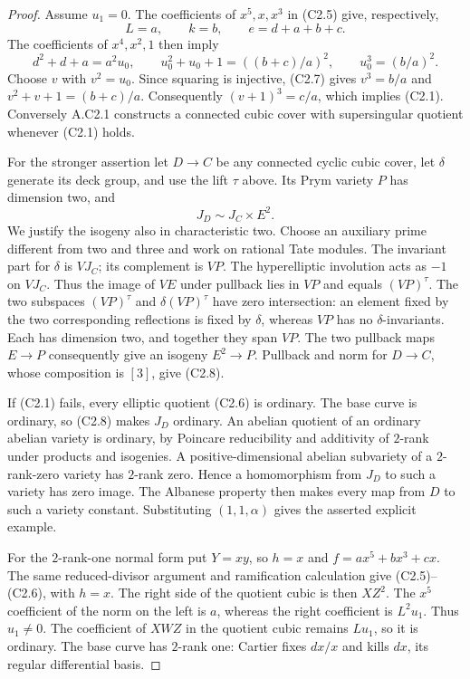 \begin{proof}
Assume $u_1=0$. The coefficients of $x^5,x,x^3$ in (C2.5) give,
respectively,
\[
                  L=a,\qquad k=b,\qquad e=d+a+b+c.
\]
The coefficients of $x^4,x^2,1$ then imply
\[
 d^2+d+a=a^2u_0,\qquad
 u_0^2+u_0+1=((b+c)/a)^2,\qquad u_0^3=(b/a)^2.               \tag{C2.7}
\]
Choose $v$ with $v^2=u_0$. Since squaring is injective,
(C2.7) gives $v^3=b/a$ and $v^2+v+1=(b+c)/a$.
Consequently $(v+1)^3=c/a$, which implies (C2.1).
Conversely A.C2.1 constructs a connected cubic cover with
supersingular quotient whenever (C2.1) holds.

For the stronger assertion let $D\to C$ be any connected cyclic
cubic cover, let $\delta$ generate its deck group, and use the lift
$\tau$ above. Its Prym variety $P$ has dimension two, and
\[
                       J_D\sim J_C\times E^2.              \tag{C2.8}
\]
We justify the isogeny also in characteristic two. Choose an auxiliary
prime different from two and three and work on rational Tate modules.
The invariant part for $\delta$ is $VJ_C$; its complement is $VP$.
The hyperelliptic involution acts as $-1$ on $VJ_C$. Thus the image
of $VE$ under pullback lies in $VP$ and equals $(VP)^\tau$.
The two subspaces $(VP)^\tau$ and
$\delta(VP)^\tau$ have zero intersection: an element fixed by the
two corresponding reflections is fixed by $\delta$, whereas $VP$
has no $\delta$-invariants. Each has dimension two, and together
they span $VP$. The two pullback maps $E\to P$ consequently give
an isogeny $E^2\to P$. Pullback and norm for $D\to C$, whose
composition is $[3]$, give (C2.8).

If (C2.1) fails, every elliptic quotient (C2.6) is ordinary. The
base curve is ordinary, so (C2.8) makes $J_D$ ordinary. An abelian
quotient of an ordinary abelian variety is ordinary, by Poincare
reducibility and additivity of $2$-rank under products and isogenies.
A positive-dimensional abelian subvariety of a $2$-rank-zero variety
has $2$-rank zero. Hence a homomorphism from $J_D$ to such a variety
has zero image. The Albanese property then makes every map from
$D$ to such a variety constant. Substituting $(1,1,\alpha)$ gives
the asserted explicit example.

For the $2$-rank-one normal form put $Y=xy$, so $h=x$ and
$f=a x^5+b x^3+c x$. The same reduced-divisor argument and
ramification calculation give (C2.5)--(C2.6), with $h=x$.
The right side of the quotient cubic is then $XZ^2$.
The $x^5$ coefficient of the norm on the left is $a$, whereas
the right coefficient is $L^2u_1$. Thus $u_1\ne0$. The
coefficient of $XWZ$ in the quotient cubic remains $Lu_1$,
so it is ordinary. The base curve has $2$-rank one: Cartier
fixes $dx/x$ and kills $dx$, its regular differential basis.
\end{proof}

